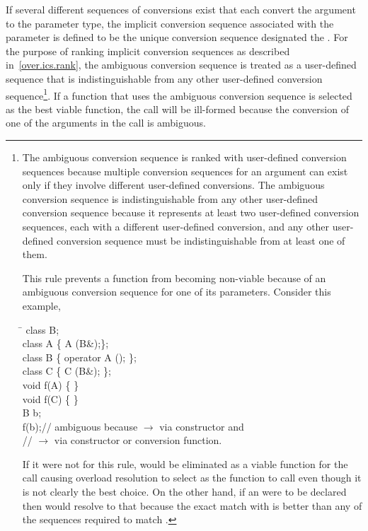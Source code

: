 \pnum
If several different sequences of conversions exist that each
convert the argument to the parameter type, the implicit
conversion sequence associated with the parameter is defined to be
the unique conversion sequence designated the
.
%
For the purpose of ranking implicit conversion sequences as described
in~\ref{over.ics.rank}, the ambiguous conversion sequence is treated
as a user-defined sequence that is indistinguishable from any
other user-defined conversion sequence\footnote{The ambiguous conversion
sequence is ranked with user-defined
conversion sequences because multiple conversion sequences
for an argument can exist only if they involve different
user-defined conversions.  The ambiguous conversion sequence
is indistinguishable from any other user-defined conversion
sequence because it represents at least two user-defined conversion
sequences, each with a different user-defined conversion, and
any other user-defined conversion sequence must be
indistinguishable from at least one of them.

This rule prevents a function from becoming non-viable because of an ambiguous
conversion sequence for one of its parameters.
Consider this example,

\begin{ttfamily}
\begin{tabbing}
\hspace{2in}\=\kill%
\indent class B;\\
\indent class A \{ A (B\&);\};\\
\indent class B \{ operator A (); \};\\
\indent class C \{ C (B\&); \};\\
\indent void f(A) \{ \}\\
\indent void f(C) \{ \}\\
\indent B b;\\
\indent f(b);\>\textrm{// ambiguous because  $\to$  via constructor and}\\
\indent \>\textrm{//  $\to$  via constructor or conversion function.}
\end{tabbing}
\end{ttfamily}

If it were not for this rule,
would be eliminated as a viable
function for the call
causing overload resolution to select
as the function to call even though it is not clearly the best
choice.
On the other hand, if an
were to be declared then
would resolve to that
because the exact match
with
is better than any of the sequences required to match
.}.
If a function that uses the ambiguous conversion sequence is selected
as the best viable function, the call will be ill-formed because the conversion
of one of the arguments in the call is ambiguous.


